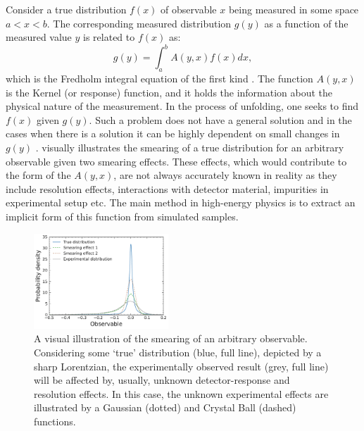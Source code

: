 Consider a true distribution $f(x)$ of observable $x$ being measured in some space $a<x<b$.
The corresponding measured distribution $g(y)$ as a function of the measured value $y$ is related to $f(x)$ as:
\begin{equation}\label{eq:fredholm_integral}
    g(y) =  \int_a^b A(y,x) f(x) dx,
\end{equation}
which is the Fredholm integral equation of the first kind \cite{Blobel_Lohrmann_1998}.
The function $A(y, x)$ is the Kernel (or response) function, and it holds the information about the physical nature of the measurement.
In the process of unfolding, one seeks to find $f(x)$ given $g(y)$.
Such a problem does not have a general solution and in the cases when there is a solution it can be highly dependent on small changes in $g(y)$ \cite{Delves_Walsh_1974}.
 visually illustrates the smearing of a true distribution for an arbitrary observable given two smearing effects.
These effects, which would contribute to the form of the $A(y,x)$, are not always accurately known in reality
as they include resolution effects, interactions with detector material, impurities in experimental setup etc.
The main method in high-energy physics is to extract an implicit form of this function from simulated samples.

\begin{figure}[htbp!]
    \centering
\includegraphics[width=0.45\textwidth]{figures/analysis_techniques/experimental_smearing.pdf}
\caption{\label{fig:smearing_illustration} 
A visual illustration of the smearing of an arbitrary observable.
Considering some `true' distribution (blue, full line), depicted by a sharp Lorentzian, the experimentally observed result (grey, full line) will be affected by, usually, unknown detector-response and resolution effects.
In this case, the unknown experimental effects are illustrated by a Gaussian (dotted) and Crystal Ball (dashed) functions.}
\end{figure}

